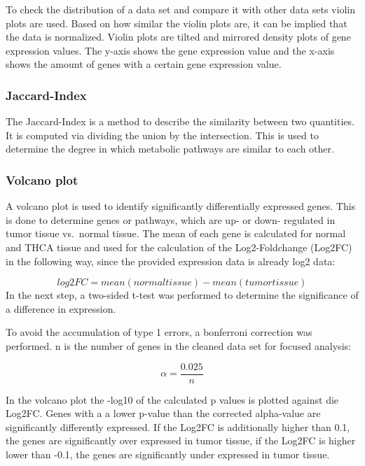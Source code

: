 \documentclass[
]{article}
\begin{document}
To check the distribution of a data set and compare it with other data
sets violin plots are used. Based on how similar the violin plots are,
it can be implied that the data is normalized. Violin plots are tilted
and mirrored density plots of gene expression values. The y-axis shows
the gene expression value and the x-axis shows the amount of genes with
a certain gene expression value.

\hypertarget{jaccard-index}{%
\subsubsection{Jaccard-Index}\label{jaccard-index}}

The Jaccard-Index is a method to describe the similarity between two
quantities. It is computed via dividing the union by the intersection.
This is used to determine the degree in which metabolic pathways are
similar to each other.

\hypertarget{volcano-plot}{%
\subsubsection{Volcano plot}\label{volcano-plot}}

A volcano plot is used to identify significantly differentially
expressed genes. This is done to determine genes or pathways, which are
up- or down- regulated in tumor tissue vs.~normal tissue. The mean of
each gene is calculated for normal and THCA tissue and used for the
calculation of the Log2-Foldchange (Log2FC) in the following way, since
the provided expression data is already log2 data:

\[
log2FC = mean(normal tissue) - mean(tumor tissue)
\] In the next step, a two-sided t-test was performed to determine the
significance of a difference in expression.

To avoid the accumulation of type 1 errors, a bonferroni correction was
performed. n is the number of genes in the cleaned data set for focused
analysis:

\[
\alpha = \frac{0.025}{n}
\]

In the volcano plot the -log10 of the calculated p values is plotted
against die Log2FC. Genes with a a lower p-value than the corrected
alpha-value are significantly differently expressed. If the Log2FC is
additionally higher than 0.1, the genes are significantly over expressed
in tumor tissue, if the Log2FC is higher lower than -0.1, the genes are
significantly under expressed in tumor tissue.
\end{document}
